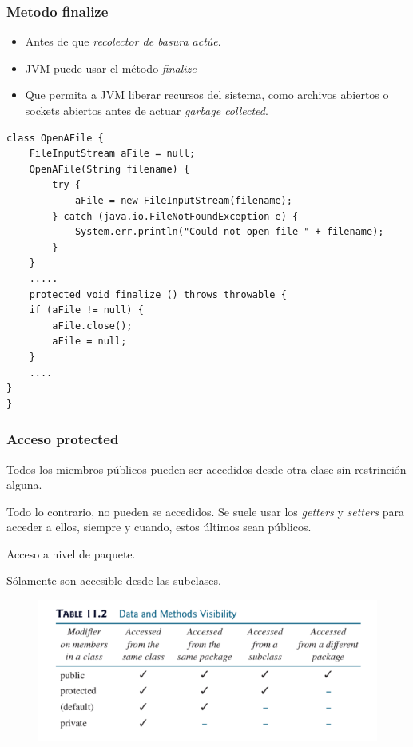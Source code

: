 \documentclass{beamer}
\begin{document}
\begin{frame}[fragile]
\frametitle{Metodo finalize}
\begin{itemize}[<+->]
\item Antes de que \emph{recolector de basura actúe}.
\item JVM puede usar el método \emph{finalize}
\item Que permita a JVM liberar recursos del sistema, como archivos abiertos o sockets abiertos antes de actuar \emph{garbage collected}.
\end{itemize}
\pause
\begin{scriptsize}
\begin{verbatim}
class OpenAFile {
    FileInputStream aFile = null;
    OpenAFile(String filename) {
        try {
            aFile = new FileInputStream(filename);
        } catch (java.io.FileNotFoundException e) {
            System.err.println("Could not open file " + filename);
        }
    }
    .....
    protected void finalize () throws throwable {
    if (aFile != null) {
        aFile.close();
        aFile = null;
    }
    ....
}
}

\end{verbatim}
\end{scriptsize}
\end{frame}

\begin{frame}
\frametitle{Acceso protected}
\begin{description}[<+->]
\item[public] Todos los miembros públicos pueden ser accedidos desde otra clase sin restrinción alguna.
\item[private] Todo lo contrario, no pueden se accedidos. Se suele usar los \emph{getters} y \emph{setters} para acceder a ellos, siempre y cuando, estos últimos sean públicos.
\item[amistoso] Acceso a nivel de paquete.
\item[protected] Sólamente son accesible desde las subclases.
\end{description}
\begin{figure}
\includegraphics[scale=0.5]{imagenes/acceso.png}
\end{figure}
\end{frame}
\end{document}
